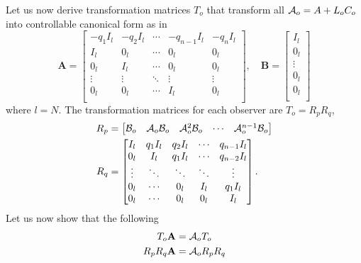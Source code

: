 Let us now derive transformation matrices $T_o$ that transform all $\mathcal{A}_o=A+L_{o}C_{o}$ into controllable canonical form as in \cite[Sec. 4.3.2]{Hespanha2018LinearTheory}
\begin{equation}\label{eqn:controllable-canonical-form}
    \mathbf{A} =
    \begin{bmatrix}
        -q_1I_l & -q_2I_l & \cdots & -q_{n-1}I_l & -q_nI_l \\
        I_l & 0_l & \cdots & 0_l & 0_l \\
        0_l & I_l & \cdots & 0_l & 0_l \\
        \vdots & \vdots & \ddots & \vdots & \vdots \\
        0_l & 0_l & \cdots & I_l & 0_l \\
    \end{bmatrix}, \quad
    \mathbf{B} = 
    \begin{bmatrix}
        I_l \\ 0_l \\ \vdots \\ 0_l \\ 0_l \\
    \end{bmatrix}
\end{equation}
where $l=N$. The transformation matrices for each observer are $T_o=R_pR_q$,
\begin{equation}
    \begin{split}
         R_p &=
        \begin{bmatrix}
            \mathcal{B}_o & \mathcal{A}_o\mathcal{B}_o & \mathcal{A}^{2}_o\mathcal{B}_o & \cdots & \mathcal{A}^{n-1}_o\mathcal{B}_o \\
        \end{bmatrix} \\
        R_q &=
        \begin{bmatrix}
            I_l & q_1I_l & q_2I_l & \cdots & q_{n-1}I_l \\
            0_l & I_l & q_1I_l & \cdots & q_{n-2}I_l \\
            \vdots & \ddots & \ddots & \ddots & \vdots \\
            0_l & \cdots & 0_l & I_l & q_1I_l \\
            0_l & \cdots & 0_l & 0_l & I_l \\
        \end{bmatrix}.
    \end{split}
\end{equation}
Let us now show that the following
\begin{equation}\label{eqn:A-transformation}
    \begin{split}
        T_o\mathbf{A} &= \mathcal{A}_oT_o \\
        R_pR_q\mathbf{A} &= \mathcal{A}_oR_pR_q \\
    \end{split}
\end{equation}
